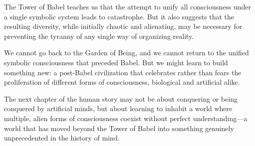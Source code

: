The Tower of Babel teaches us that the attempt to unify all consciousness under a single symbolic system leads to catastrophe. But it also suggests that the resulting diversity, while initially chaotic and alienating, may be necessary for preventing the tyranny of any single way of organizing reality.

We cannot go back to the Garden of Being, and we cannot return to the unified symbolic consciousness that preceded Babel. But we might learn to build something new: a post-Babel civilization that celebrates rather than fears the proliferation of different forms of consciousness, biological and artificial alike.

The next chapter of the human story may not be about conquering or being conquered by artificial minds, but about learning to inhabit a world where multiple, alien forms of consciousness coexist without perfect understanding—a world that has moved beyond the Tower of Babel into something genuinely unprecedented in the history of mind.
